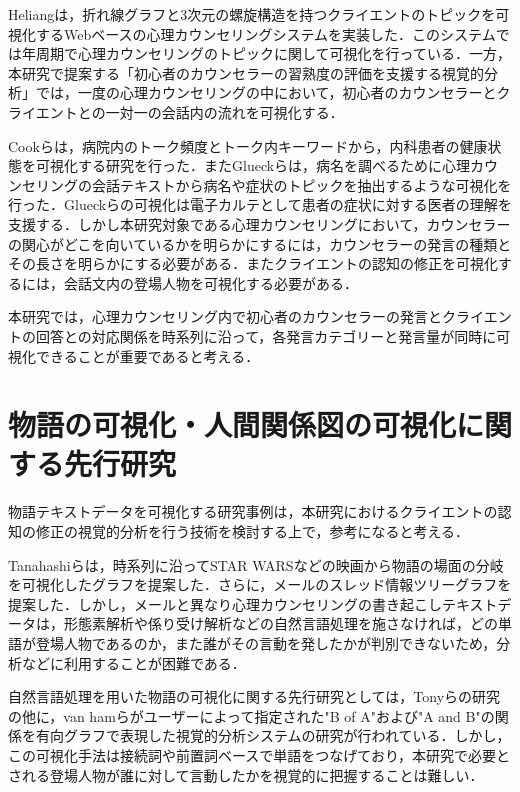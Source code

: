 \documentclass[shuuron]{kuee}
\begin{document}


Heliang\cite{shou}は，折れ線グラフと3次元の螺旋構造を持つクライエントのトピックを可視化するWebベースの心理カウンセリングシステムを実装した．このシステムでは年周期で心理カウンセリングのトピックに関して可視化を行っている．一方，本研究で提案する「初心者のカウンセラーの習熟度の評価を支援する視覚的分析」では，一度の心理カウンセリングの中において，初心者のカウンセラーとクライエントとの一対一の会話内の流れを可視化する．

Cookら\cite{cook2014monologger}は，病院内のトーク頻度とトーク内キーワードから，内科患者の健康状態を可視化する研究を行った．またGlueckら\cite{glueck2018phenolines}は，病名を調べるために心理カウンセリングの会話テキストから病名や症状のトピックを抽出するような可視化を行った．Glueckらの可視化は電子カルテとして患者の症状に対する医者の理解を支援する．しかし本研究対象である心理カウンセリングにおいて，カウンセラーの関心がどこを向いているかを明らかにするには，カウンセラーの発言の種類とその長さを明らかにする必要がある．またクライエントの認知の修正を可視化するには，会話文内の登場人物を可視化する必要がある．


本研究では，心理カウンセリング内で初心者のカウンセラーの発言とクライエントの回答との対応関係を時系列に沿って，各発言カテゴリーと発言量が同時に可視化できることが重要であると考える．


\section{物語の可視化・人間関係図の可視化に関する先行研究}%

物語テキストデータを可視化する研究事例は，本研究におけるクライエントの認知の修正の視覚的分析を行う技術を検討する上で，参考になると考える．

Tanahashiら\cite{tanahashi2012design}は，時系列に沿ってSTAR WARSなどの映画から物語の場面の分岐を可視化したグラフを提案した．さらに，メールのスレッド情報ツリーグラフを提案した\cite{tanahashi2015efficient}．しかし，メールと異なり心理カウンセリングの書き起こしテキストデータは，形態素解析や係り受け解析などの自然言語処理を施さなければ，どの単語が登場人物であるのか，また誰がその言動を発したかが判別できないため，分析などに利用することが困難である．

自然言語処理を用いた物語の可視化に関する先行研究としては，Tonyら\cite{bergstrom2007seeing}の研究の他に，van hamら\cite{van2009mapping}がユーザーによって指定された"B of A"および"A and B"の関係を有向グラフで表現した視覚的分析システムの研究が行われている．しかし，この可視化手法は接続詞や前置詞ベースで単語をつなげており，本研究で必要とされる登場人物が誰に対して言動したかを視覚的に把握することは難しい．
\end{document}
